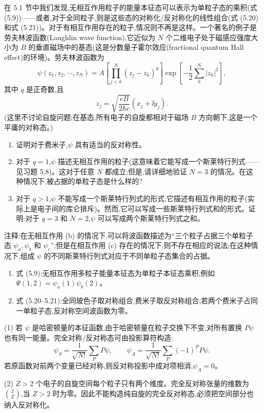 \begin{question}
在 5.1 节中我们发现,无相互作用粒子的能量本征态可以表示为单粒子态的乘积(式 (5.9))——或者,对于全同粒子,则是这些态的对称化/反对称化的线性组合(式 (5.20) 和式 (5.21))。对于有相互作用存在的粒子,情况则不再是这样。一个著名的例子是劳夫林波函数(Laughlin wave function),它近似为 $N$ 个二维电子处于磁感应强度大小为 $B$ 的垂直磁场中的基态(这是分数量子霍尔效应(fractional quantum Hall effect)的环境)。劳夫林波函数为
\[
\psi(z_1,z_2,\cdots,z_N)=A\left[\prod_{j<k}^{N}(z_j-z_k)^q\right]\exp\left[-\frac12\sum_k^N |z_k|^2\right],
\]
其中 $q$ 是正奇数,且
\[
z_j=\sqrt{\frac{eB}{2\hbar c}}(x_j+\ii y_j).
\]
(这里不讨论自旋问题;在基态,所有电子的自旋都相对于磁场 $B$ 方向朝下,这是一个平庸的对称态。)
\begin{enumerate}
\item 证明对于费米子,$\psi$ 具有适当的反对称性。
\item 对于 $q=1$,$\psi$ 描述无相互作用的粒子(这意味着它能写成一个斯莱特行列式——见习题 5.8)。这对于任意 $N$ 都成立;但是,请详细地验证 $N=3$ 的情况。在这种情况下,被占据的单粒子态是什么样的?
\item 对于 $q>1$,$\psi$ 不能写成一个斯莱特行列式的形式;它描述有相互作用的粒子(实际上是电子间的库仑排斥)。然而,它可以写成一些斯莱特行列式和的形式。证明:对于 $q=3$ 和 $N=2$,$\psi$ 可以写成两个斯莱特行列式之和。
\end{enumerate}
注释:在无相互作用 (b) 的情况下,可以将波函数描述为“三个粒子占据三个单粒子态 $\psi_a,\psi_b$ 和 $\psi_c$”;但是在相互作用 (c) 存在的情况下,则不存在相应的说法;在这种情况下,组成 $\psi$ 的不同斯莱特行列式对应于不同单粒子态集合的占据。

\par\smallskip
{}
\begin{enumerate}[leftmargin=2.2em,itemsep=0.12em,topsep=0.12em,parsep=0pt]
\item 式 (5.9):无相互作用多粒子能量本征态为单粒子本征态乘积,例如 $\Psi(1,2)=\psi_a(1)\psi_b(2)$。
\item 式 (5.20--5.21):全同玻色子取对称组合,费米子取反对称组合;若两个费米子占同一单粒子态,反对称空间波函数为零。
\end{enumerate}

\end{question}
\begin{solution}

(1) 若 $\psi$ 是哈密顿量的本征函数,由于哈密顿量在粒子交换下不变,对所有置换 $P\psi$ 也有同一能量。完全对称/反对称态可由投影算符构造:
\[
\psi_S=\frac1{\sqrt{N!}}\sum_P P\psi,
\qquad
\psi_A=\frac1{\sqrt{N!}}\sum_P(-1)^P P\psi.
\]
若原函数对前两个变量已经对称,则反对称投影中成对项相消,$\psi_A=0$。

(2) $Z>2$ 个电子的自旋空间每个粒子只有两个维度。完全反对称张量的维数为 $\binom{2}{Z}$,当 $Z>2$ 时为零。因此不能构造纯自旋的完全反对称态,必须把空间部分也纳入反对称化。

\end{solution}

